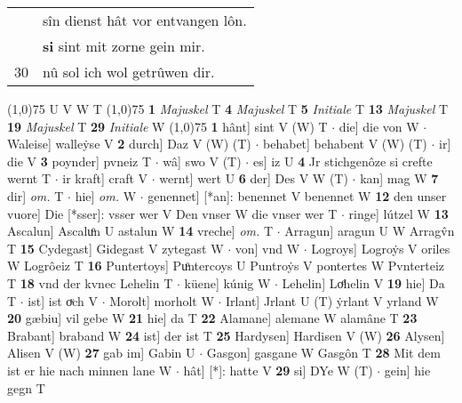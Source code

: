 \documentclass[8pt,a4paper,notitlepage]{article}
\begin{document}
\begin{table}[ht]
\begin{minipage}[t]{0.5\linewidth}
\begin{tabular}{rl}
 & sîn dienst hât vor entvangen lôn.\\ 
 & \textbf{si} sint mit zorne gein mir.\\ 
30 & nû sol ich wol getrûwen dir.\\ 
\end{tabular}
\scriptsize
\line(1,0){75} \newline
U V W T \newline
\line(1,0){75} \newline
\textbf{1} \textit{Majuskel} T  \textbf{4} \textit{Majuskel} T  \textbf{5} \textit{Initiale} T  \textbf{13} \textit{Majuskel} T  \textbf{19} \textit{Majuskel} T  \textbf{29} \textit{Initiale} W  \newline
\line(1,0){75} \newline
\textbf{1} hânt] sint V (W) T  $\cdot$ die] die von W  $\cdot$ Waleise] walleẏse V \textbf{2} durch] Daz V (W) (T)  $\cdot$ behabet] behabent V (W) (T)  $\cdot$ ir] die V \textbf{3} poynder] pvneiz T  $\cdot$ wâ] swo V (T)  $\cdot$ es] iz U \textbf{4} Jr stichgenôze si crefte wernt T  $\cdot$ ir kraft] craft V  $\cdot$ wernt] wert U \textbf{6} der] Des V W (T)  $\cdot$ kan] mag W \textbf{7} dir] \textit{om.} T  $\cdot$ hie] \textit{om.} W  $\cdot$ genennet] [*an]: benennet V benennet W \textbf{12} den unser vuore] Die [*sser]: vsser wer V Den vnser W die vnser wer T  $\cdot$ ringe] lútzel W \textbf{13} Ascalun] Ascaluͦn U astalun W \textbf{14} vreche] \textit{om.} T  $\cdot$ Arragun] aragun U W Arragv̂n T \textbf{15} Cydegast] Gidegast V zytegast W  $\cdot$ von] vnd W  $\cdot$ Logroys] Logroẏs V oriles W Logrôeiz T \textbf{16} Puntertoys] Puͦntercoys U Puntroẏs V pontertes W Pvnterteiz T \textbf{18} vnd der kvnec Lehelin T  $\cdot$ küene] kúnig W  $\cdot$ Lehelin] Loͤhelin V \textbf{19} hie] Da T  $\cdot$ ist] ist oͮch V  $\cdot$ Morolt] morholt W  $\cdot$ Irlant] Jrlant U (T) ẏrlant V yrland W \textbf{20} gæbiu] vil gebe W \textbf{21} hie] da T \textbf{22} Alamane] alemane W alamâne T \textbf{23} Brabant] braband W \textbf{24} ist] der ist T \textbf{25} Hardysen] Hardisen V (W) \textbf{26} Alysen] Alisen V (W) \textbf{27} gab im] Gabin U  $\cdot$ Gasgon] gasgane W Gasgôn T \textbf{28} Mit dem ist er hie nach minnen lane W  $\cdot$ hât] [*]: hatte V \textbf{29} si] DYe W (T)  $\cdot$ gein] hie gegn T \newline
\end{minipage}
\end{table}
\end{document}
